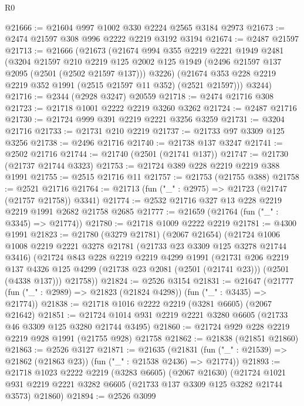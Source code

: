 \begin{lexlean}{R0}
\begin{coremodule}
@21666 := @21604 @997 @1002 @330 @2224 @2565 @3184 @2973
@21673 := @2474 @21597 @308 @996 @2222 @2219 @3192 @3194
@21674 := @2487 @21597
@21713 := @21666
    (@21673
      (@21674
        @994
        @355
        @2219
        @2221
        @1949
        @2481
        (@3204
          @21597
          @210
          @2219
          @125
          @2002
          @125
          @1949
          (@2496 @21597 @137 @2095 (@2501 (@2502 @21597 @137)))
          @3226)
        (@21674 @353 @228 @2219 @2219 @352 @1991 (@2515 @21597 @11 @352) (@2521 @21597)))
      @3244)
@21716 := @2344 (@2928 @3247) @20559
@21718 := @2474 @21716 @308
@21723 := @21718 @1001 @2222 @2219 @3260 @3262
@21724 := @2487 @21716
@21730 := @21724 @999 @391 @2219 @2221 @3256 @3259
@21731 := @3204 @21716
@21733 := @21731 @210 @2219
@21737 := @21733 @97 @3309 @125 @3256
@21738 := @2496 @21716
@21740 := @21738 @137 @3247
@21741 := @2502 @21716
@21744 := @21740 (@2501 (@21741 @137))
@21747 := @21730 (@21737 @21744 @3323)
@21753 := @21724 @389 @228 @2219 @2219 @388 @1991
@21755 := @2515 @21716 @11
@21757 := @21753 (@21755 @388)
@21758 := @2521 @21716
@21764 := @21713 (fun ("_" : @2975) => @21723 (@21747 (@21757 @21758)) @3341)
@21774 := @2532 @21716 @327 @13 @228 @2219 @2219 @1991 @2682 @21758 @2685
@21777 := @21659 (@21764 (fun ("_" : @3345) => @21774))
@21780 := @21718 @1009 @2222 @2219
@21781 := @4300 @1991
@21823 := @21780
    (@3279 @21781)
    (@2067 @21654)
    (@21724
      @1006
      @1008
      @2219
      @2221
      @3278
      @21781
      (@21733 @23 @3309 @125 @3278 @21744 @3416)
      (@21724
        @843
        @228
        @2219
        @2219
        @4299
        @1991
        (@21731
          @206
          @2219
          @137
          @4326
          @125
          @4299
          (@21738 @23 @2081 (@2501 (@21741 @23)))
          (@2501 (@4338 @137)))
        @21758))
@21824 := @2526 @3154
@21831 := @21647 (@21777 (fun ("_" : @2989) => @21823 (@21824 @4298)) (fun ("_" : @3435) => @21774))
@21838 := @21718 @1016 @2222 @2219 (@3281 @6605) (@2067 @21642)
@21851 := @21724 @1014 @931 @2219 @2221 @3280 @6605 (@21733 @46 @3309 @125 @3280 @21744 @3495)
@21860 := @21724 @929 @228 @2219 @2219 @928 @1991 (@21755 @928) @21758
@21862 := @21838 (@21851 @21860)
@21863 := @2526 @3127
@21871 := @21635
    (@21831 (fun ("_" : @21539) => @21862 (@21863 @23)) (fun ("_" : @21538 @2436) => @21774))
@21893 := @21718
    @1023
    @2222
    @2219
    (@3283 @6605)
    (@2067 @21630)
    (@21724 @1021 @931 @2219 @2221 @3282 @6605 (@21733 @137 @3309 @125 @3282 @21744 @3573) @21860)
@21894 := @2526 @3099

\end{coremodule}
\end{lexlean}
